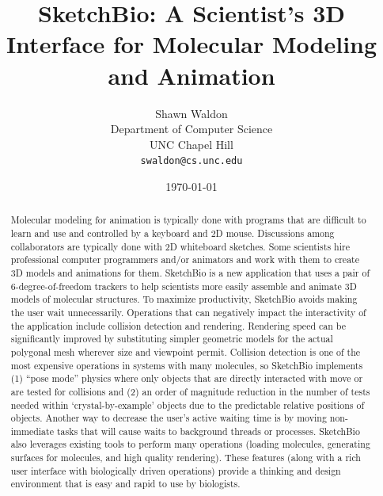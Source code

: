 \documentclass{article} %
\begin{document}
\title{SketchBio: A Scientist's 3D Interface for Molecular Modeling and Animation}
\author{Shawn Waldon\\Department of Computer Science\\
			UNC Chapel Hill\\\texttt{swaldon@cs.unc.edu}}
\date{\today}
\maketitle

\begin{abstract}
Molecular modeling for animation is typically done with programs that are difficult to learn and use and controlled by a keyboard and 2D mouse.  Discussions among collaborators are typically done with 2D whiteboard sketches.  Some scientists hire professional computer programmers and/or animators and work with them to create 3D models and animations for them.  SketchBio is a new application that uses a pair of 6-degree-of-freedom trackers to help scientists more easily assemble and animate 3D models of molecular structures.  To maximize productivity, SketchBio avoids making the user wait unnecessarily.  Operations that can negatively impact the interactivity of the application include collision detection and rendering.  Rendering speed can be significantly improved by substituting simpler geometric models for the actual polygonal mesh wherever size and viewpoint permit.  Collision detection is one of the most expensive operations in systems with many molecules, so SketchBio implements (1) “pose mode” physics where only objects that are directly interacted with move or are tested for collisions and (2) an order of magnitude reduction in the number of tests needed within ‘crystal-by-example’ objects due to the predictable relative positions of objects.  Another way to decrease the user’s active waiting time is by moving non-immediate tasks that will cause waits to background threads or processes.  SketchBio also leverages existing tools to perform many operations (loading molecules, generating surfaces for molecules, and high quality rendering).  These features (along with a rich user interface with biologically driven operations) provide a thinking and design environment that is easy and rapid to use by biologists.

\end{abstract}
\end{document}
